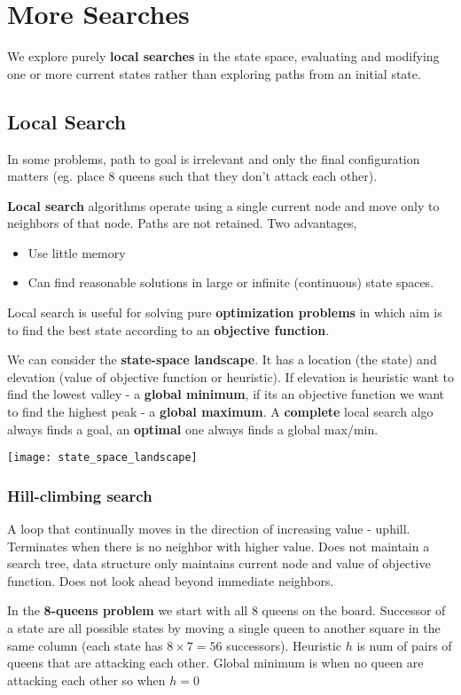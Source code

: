 \chapter{More Searches}
We explore purely \textbf{local searches}  in the state space, evaluating and modifying one or more current states rather than  exploring paths from an initial state. 


\section{Local Search}
In some problems, path to goal is irrelevant and only the final configuration matters (eg. place 8 queens such that they don't attack each other).

\textbf{Local search} algorithms operate using a single current node and move only to neighbors of that node. Paths are not retained. Two advantages, 
\begin{itemize}
    \item Use little memory
    \item Can find reasonable solutions in large or infinite (continuous) state spaces. 
\end{itemize}
Local search is useful for solving pure \textbf{optimization problems}  in which aim is to find the best state according to an \textbf{objective function}.

We can consider the \textbf{state-space landscape}. It has a location (the state) and elevation (value of objective function or heuristic). If elevation is heuristic want to find the lowest valley - a \textbf{global minimum}, if its an objective function we want to find the highest peak - a \textbf{global maximum}. A \textbf{complete}  local search algo always finds a goal, an \textbf{optimal} one always finds a global max/min.

\texttt{[image: state\_space\_landscape]}


\subsection*{Hill-climbing search}
A loop that continually moves in the direction of increasing value - uphill. Terminates when there is no neighbor with higher value. Does not maintain a search tree, data structure only maintains current node and value of objective function. Does not look ahead beyond immediate neighbors.

\begin{eg}
    In the \textbf{8-queens problem} we start with all 8 queens on the board. Successor of a state are all possible states by moving a single queen to another square in the same column (each state has $8 \times 7 = 56 $ successors). Heuristic $h$ is num of pairs of queens that are attacking each other. Global minimum is when no queen are attacking each other so when $h =  0$
\end{eg}

